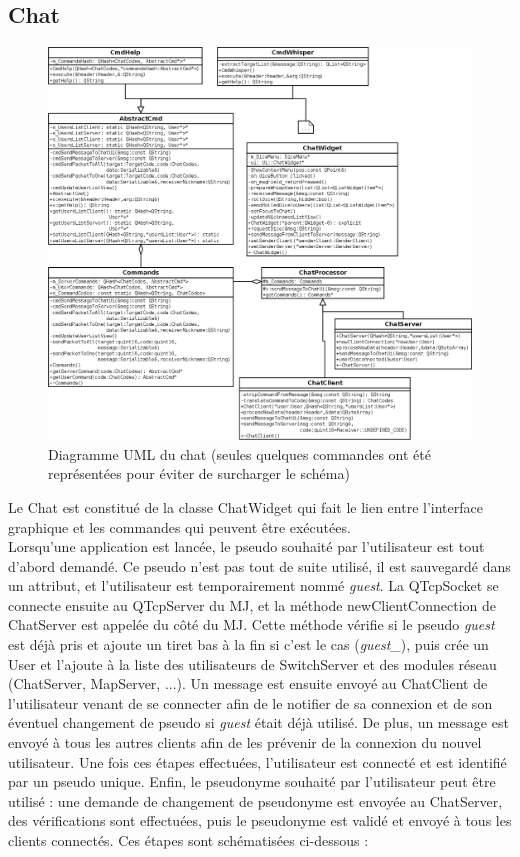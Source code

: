 \subsection{Chat}

\begin{figure}[h!]
	\centering
	\includegraphics[width=\textwidth]{img/chat_uml.png}
	\caption{Diagramme UML du chat (seules quelques commandes ont été représentées pour éviter de surcharger le schéma)}
\end{figure}

Le Chat est constitué de la classe ChatWidget qui fait le lien entre l'interface graphique et les commandes qui peuvent être exécutées.\\

Lorsqu'une application est lancée, le pseudo souhaité par l'utilisateur est tout d'abord demandé. Ce pseudo n'est pas tout de suite utilisé, il est sauvegardé dans un attribut, et l'utilisateur est temporairement nommé \emph{guest}. La QTcpSocket se connecte ensuite au QTcpServer du MJ, et la méthode newClientConnection de ChatServer est appelée du côté du MJ. Cette méthode vérifie si le pseudo \emph{guest} est déjà pris et ajoute un tiret bas à la fin si c'est le cas (\emph{guest\_}), puis crée un User et l'ajoute à la liste des utilisateurs de SwitchServer et des modules réseau (ChatServer, MapServer, ...). Un message est ensuite envoyé au ChatClient de l'utilisateur venant de se connecter afin de le notifier de sa connexion et de son éventuel changement de pseudo si \emph{guest} était déjà utilisé. De plus, un message est envoyé à tous les autres clients afin de les prévenir de la connexion du nouvel utilisateur. Une fois ces étapes effectuées, l'utilisateur est connecté et est identifié par un pseudo unique. Enfin, le pseudonyme souhaité par l'utilisateur peut être utilisé : une demande de changement de pseudonyme est envoyée au ChatServer, des vérifications sont effectuées, puis le pseudonyme est validé et envoyé à tous les clients connectés. Ces étapes sont schématisées ci-dessous :

